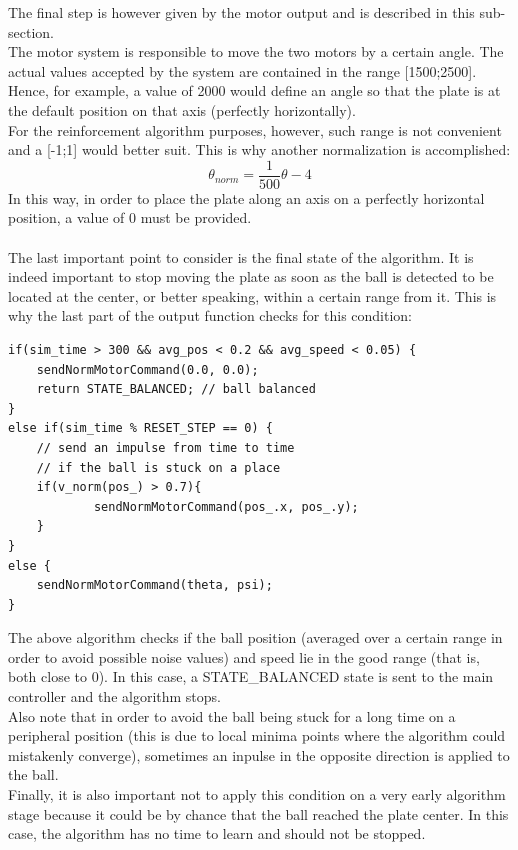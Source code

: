 \documentclass{article}
\begin{document}
The final step is however given by the motor output and is described in this sub-section. \\
The motor system is responsible to move the two motors by a certain angle. The actual values accepted by the system are contained in the range [1500;2500]. Hence, for example, a value of 2000 would define an angle so that the plate is at the default position on that axis (perfectly horizontally). \\
For the reinforcement algorithm purposes, however, such range is not convenient and a [-1;1] would better suit. This is why another normalization is accomplished:
\[
\theta_{norm} = \frac{1}{500}\theta - 4
\]
In this way, in order to place the plate along an axis on a perfectly horizontal position, a value of 0 must be provided.\\ \\

The last important point to consider is the final state of the algorithm. It is indeed important to stop moving the plate as soon as the ball is detected to be located at the center, or better speaking, within a certain range from it. This is why the last part of the output function checks for this condition:
\begin{verbatim}
if(sim_time > 300 && avg_pos < 0.2 && avg_speed < 0.05) {
    sendNormMotorCommand(0.0, 0.0);
    return STATE_BALANCED; // ball balanced
}
else if(sim_time % RESET_STEP == 0) {
    // send an impulse from time to time
    // if the ball is stuck on a place
    if(v_norm(pos_) > 0.7){
        	sendNormMotorCommand(pos_.x, pos_.y);
    }
}
else {	
    sendNormMotorCommand(theta, psi);
}
\end{verbatim}
The above algorithm checks if the ball position (averaged over a certain range in order to avoid possible noise values) and speed lie in the good range (that is, both close to 0). In this case, a STATE\_BALANCED state is sent to the main controller and the algorithm stops.\\
Also note that in order to avoid the ball being stuck for a long time on a peripheral position (this is due to local minima points where the algorithm could mistakenly converge), sometimes an inpulse in the opposite direction is applied to the ball.\\
Finally, it is also important not to apply this condition on a very early algorithm stage because it could be by chance that the ball reached the plate center. In this case, the algorithm has no time to learn and should not be stopped.
\end{document}

